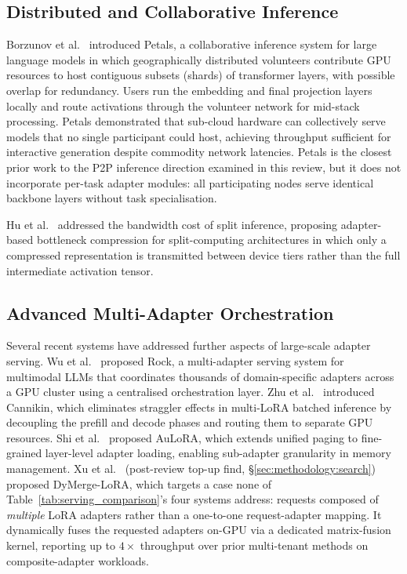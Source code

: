 \subsection{Distributed and Collaborative Inference}
\label{sec:inference_systems:distributed}

Borzunov et al.~\cite{Borzunov2023} introduced Petals, a collaborative inference system for large
language models in which geographically distributed volunteers contribute GPU
resources to host contiguous subsets (shards) of transformer layers, with possible overlap for redundancy. Users run the
embedding and final projection layers locally and route activations through the
volunteer network for mid-stack processing. Petals demonstrated that sub-cloud hardware
can collectively serve models that no single participant could host, achieving
throughput sufficient for interactive generation despite commodity network latencies.
Petals is the closest prior work to the P2P inference direction examined in this review,
but it does not incorporate per-task adapter modules: all participating nodes serve
identical backbone layers without task specialisation.

Hu et al.~\cite{HuDistributed2022} addressed the bandwidth cost of split inference, proposing
adapter-based bottleneck compression for split-computing architectures in which only
a compressed representation is transmitted between device tiers rather than the full
intermediate activation tensor.

\subsection{Advanced Multi-Adapter Orchestration}
\label{sec:inference_systems:advanced}

Several recent systems have addressed further aspects of large-scale adapter serving.
Wu et al.~\cite{WuRock2025} proposed Rock, a multi-adapter serving system for multimodal LLMs
that coordinates thousands of domain-specific adapters across a GPU cluster using a
centralised orchestration layer. Zhu et al.~\cite{ZhuCannikin2025} introduced Cannikin, which
eliminates straggler effects in multi-LoRA batched inference by decoupling the prefill
and decode phases and routing them to separate GPU resources. Shi et al.~\cite{Shi2025AuLoRA}
proposed AuLoRA, which extends unified paging to fine-grained layer-level adapter
loading, enabling sub-adapter granularity in memory management.
Xu et al.~\cite{XuDyMergeLoRA2026} (post-review top-up find,
\S\ref{sec:methodology:search}) proposed DyMerge-LoRA, which targets a case
none of Table~\ref{tab:serving_comparison}'s four systems address: requests
composed of \emph{multiple} LoRA adapters rather than a one-to-one
request-adapter mapping. It dynamically fuses the requested adapters
on-GPU via a dedicated matrix-fusion kernel, reporting up to $4\times$
throughput over prior multi-tenant methods on composite-adapter workloads.

